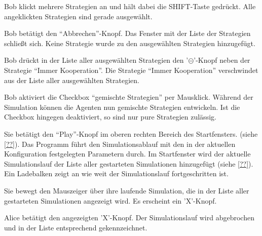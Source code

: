 \documentclass[parskip=full,11pt]{scrartcl}
\begin{document}
{Bob klickt mehrere Strategien an und hält dabei die SHIFT-Taste gedrückt.}
{Alle angeklickten Strategien sind gerade ausgewählt.}

{Bob betätigt den \enquote{Abbrechen}-Knopf.}
{Das Fenster mit der Liste der Strategien schließt sich. Keine Strategie wurde zu den ausgewählten Strategien hinzugefügt.}

{Bob drückt in der Liste aller ausgewählten Strategien den '\(\circleddash\)'-Knopf neben der Strategie \enquote{Immer Kooperation}.}
{Die Strategie \enquote{Immer Kooperation} verschwindet aus der Liste aller ausgewählten Strategien.}

{Bob aktiviert die Checkbox \enquote{gemischte Strategien} per Mausklick.}
{Während der Simulation können die Agenten nun gemischte Strategien entwickeln. Ist die Checkbox hingegen deaktiviert, so sind nur pure Strategien zulässig.}


{Sie betätigt den \enquote{Play}-Knopf im oberen rechten Bereich des Startfensters. (siehe \cref{??}).}
{Das Programm führt den Simulationsablauf mit den in der aktuellen Konfiguration festgelegten Parametern durch. Im Startfenster wird der aktuelle Simulationslauf der Liste aller gestarteten Simulationen hinzugefügt (siehe \cref{??}). Ein Ladebalken zeigt an wie weit der Simulationslauf fortgeschritten ist.}

{Sie bewegt den Mauszeiger über ihre laufende Simulation, die in der Liste aller gestarteten Simulationen angezeigt wird.}
{Es erscheint ein 'X'-Knopf.}

{Alice betätigt den angezeigten 'X'-Knopf.}
{Der Simulationslauf wird abgebrochen und in der Liste entsprechend gekennzeichnet.}

\end{document}

